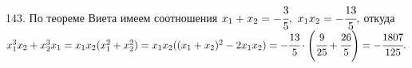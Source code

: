 143. По теореме Виета имеем соотношения $x_1+x_2=-\cfrac{3}{5},\ x_1x_2=-\cfrac{13}{5},$ откуда $x_1^3x_2+x_2^3x_1=x_1x_2(x_1^2+x_2^2)=
x_1x_2((x_1+x_2)^2-2x_1x_2)=-\cfrac{13}{5}\cdot\left(\cfrac{9}{25}+\cfrac{26}{5}\right)=
-\cfrac{1807}{125}.$\\
